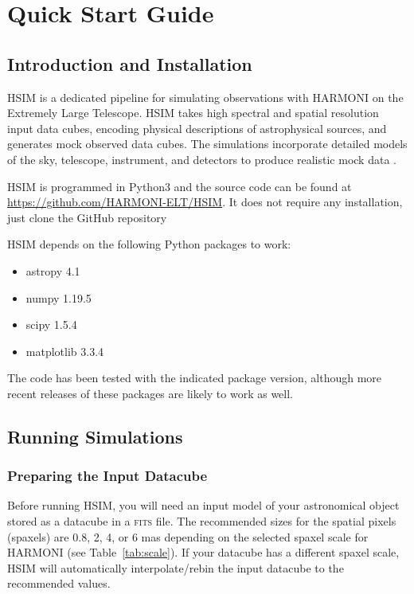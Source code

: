 \documentclass[12pt]{report}
\begin{document}
\chapter{Quick Start Guide}

\section{Introduction and Installation}

HSIM is a dedicated pipeline for simulating observations with HARMONI on the Extremely Large Telescope. HSIM takes high spectral and spatial resolution input data cubes, encoding physical descriptions of astrophysical sources, and generates mock observed data cubes. The simulations incorporate detailed models of the sky, telescope, instrument, and detectors to produce realistic mock data \citep{Zieleniewski2015}.

HSIM is programmed in Python3 and the source code can be found at \url{https://github.com/HARMONI-ELT/HSIM}. It does not require any installation, just clone the GitHub repository 


HSIM depends on the following Python packages to work:

\begin{itemize}
\setlength\itemsep{-0.5ex}
\item astropy 4.1
\item numpy 1.19.5
\item scipy 1.5.4
\item matplotlib 3.3.4
\end{itemize}

The code has been tested with the indicated package version, although more recent releases of these packages are likely to work as well.


\section{Running Simulations}

\subsection{Preparing the Input Datacube}

Before running HSIM, you will need an input model of your astronomical object stored as a datacube in a \textsc{fits} file. The recommended sizes for the spatial pixels (spaxels) are 0.8, 2, 4, or 6 mas depending on the selected spaxel scale for HARMONI (see Table~\ref{tab:scale}). If your datacube has a different spaxel scale, HSIM will automatically interpolate\slash rebin the input datacube to the recommended values.
\end{document}
